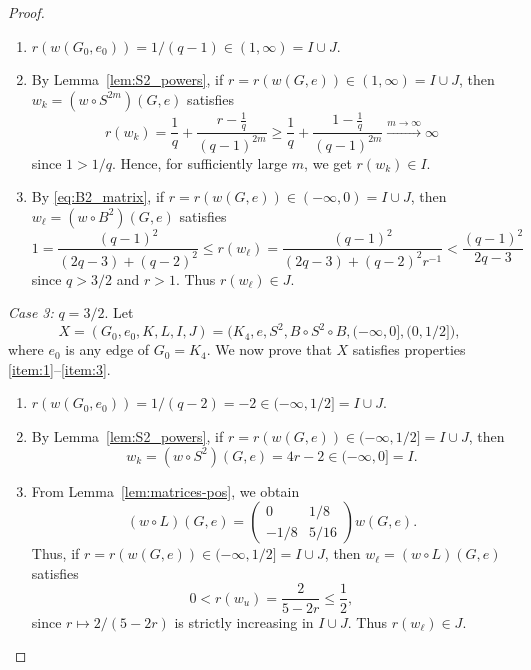 \documentclass[A4paper,reqno,oneside,12pt]{amsart}
\theoremstyle{plain}
\theoremstyle{definition}
\begin{document}
\begin{proof}
\begin{enumerate}
    \item $r(w(G_0,e_0)) = 1/(q-1)\in (1,\infty)=I \cup J$.
    \item By Lemma~\ref{lem:S2_powers}, if $r = r(w(G,e)) \in (1,\infty) = I \cup J$, then $w_k = (w \circ S^{2m})(G,e)$ satisfies 
    \begin{equation*}
        r(w_k)= \frac{1}{q} + \frac{r - \frac{1}{q}}{(q-1)^{2m}} \geq \frac{1}{q} + \frac{1 - \frac{1}{q}}{(q-1)^{2m}} \overset{m \to \infty}{\longrightarrow} \infty
    \end{equation*}
    since $1> 1/q$. Hence, for sufficiently large $m$, we get $r(w_k) \in I$.
    \item By \eqref{eq:B2_matrix}, if $r = r(w(G,e)) \in (-\infty,0) = I \cup J$, then $w_\ell = (w \circ B^2)(G,e)$ satisfies
    \begin{equation*}
        1 = \frac{(q-1)^2}{(2q-3) + (q-2)^2}\leq r(w_\ell) = \frac{(q-1)^2}{(2q-3) + (q-2)^2 r^{-1}} < \frac{(q-1)^2}{2q-3}
    \end{equation*}
    since $q>3/2$ and $r>1$. Thus 
    $r(w_\ell)\in J$.
\end{enumerate}
\emph{Case 3:} $q = 3/2$. Let \[X =(G_0,e_0,K,L,I,J)=
\big(K_4,e,S^2,B\circ S^2\circ B, (-\infty,0], (0,1/2]\big),\]
where $e_0$ is any edge of $G_0=K_4$.
We now prove that $X$ satisfies properties \eqref{item:1}--\eqref{item:3}.
\begin{enumerate}
    \item $r(w(G_0,e_0)) = 1/(q-2) = -2\in (-\infty,1/2]=I \cup J$.
    \item By Lemma~\ref{lem:S2_powers}, if $r = r(w(G,e)) \in (-\infty,1/2] = I \cup J$, then \[w_k = (w \circ S^{2})(G,e) =4r-2 \in (-\infty,0] = I.\]
    
    \item From Lemma~\ref{lem:matrices-pos}, we obtain
     \begin{equation*}
        (w \circ L) (G,e) = \begin{pmatrix}
            0 & 1/8 \\
            -1/8 & 5/16
        \end{pmatrix} w(G,e). \end{equation*}
    Thus, if $r = r(w(G,e)) \in (-\infty,1/2]= I \cup J$, then $w_\ell = (w \circ L)(G,e)$ satisfies     \begin{equation*}
        0 < r(w_u) = \frac{2}{5 - 2 r } \leq \frac{1}{2},
    \end{equation*}
    since $r\mapsto 2/(5-2r)$ is strictly increasing in $I\cup J$. Thus 
    $r(w_\ell)\in J$. \qedhere
\end{enumerate}
\end{proof}
\end{document}

